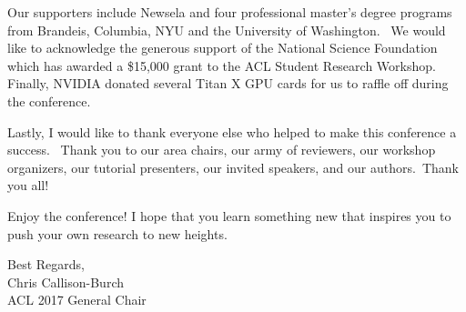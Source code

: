 Our supporters include 
Newsela 
and four professional master’s degree programs from 
Brandeis, 
Columbia, 
NYU and 
the University of Washington.  
We would like to acknowledge the generous support of the National Science Foundation which has awarded a \$15,000 grant to the ACL Student Research Workshop.
Finally, NVIDIA donated several Titan X GPU cards for us to raffle off during the conference. 

Lastly, I would like to thank everyone else who helped to make this conference a success.  Thank you to our area chairs, our army of reviewers, our workshop organizers, our tutorial presenters, our invited speakers, and our authors. Thank you all!

Enjoy the conference! I hope that you learn something new that inspires you to
push your own research to new heights.

\vskip 0.5in
\noindent Best Regards,\\
Chris Callison-Burch\\
ACL 2017 General Chair





